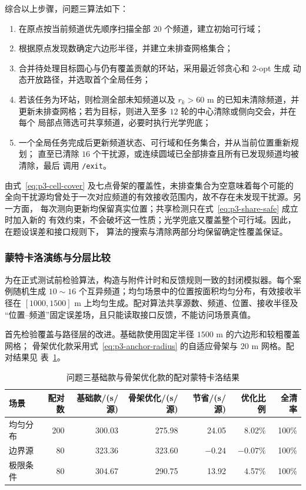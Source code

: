 综合以上步骤，问题三算法如下：
\begin{enumerate}
    \item 在原点按当前频道优先顺序扫描全部 $20$ 个频道，建立初始可行域；
    \item 根据原点发现数确定六边形半径，并建立未排查网格集合；
    \item 合并待处理目标圆心与仍有覆盖贡献的环站，采用最近邻贪心和 $2$-opt 生成
    动态开放路径，并选取首个全局任务；
    \item 若该任务为环站，则检测全部未知频道以及 $r_k>60$ m 的已知未清除频道，并
    更新未排查网格；若为目标，则进入至多 $12$ 轮的中心清除或侧向交会，并在每个
    局部点筛选可共享频道，必要时执行光学兜底；
    \item 一个全局任务完成后更新频道状态、可行域和任务集合，并从当前位置重新规划；
    直至已清除 $16$ 个干扰源，或连续圆域已全部排查且所有已发现频道均被清除，最后
    调用 \texttt{/exit}。
\end{enumerate}

由式~\eqref{eq:p3-cell-cover} 及七点骨架的覆盖性，未排查集合为空意味着每个可能的
全向干扰源均曾处于一次对应频道的有效接收范围内，故不存在未发现干扰源。另一方面，
每次测向更新均保留真实位置；共享检测只在式~\eqref{eq:p3-share-safe} 成立时加入新的
有效约束，不会破坏这一性质；光学兜底又覆盖整个可行域。因此，在题设误差和接口规则下，
算法的搜索与清除两部分均保留确定性覆盖保证。

\subsubsection{蒙特卡洛演练与分层比较}

为在正式测试前检验算法，构造与附件计时和反馈规则一致的封闭模拟器。每个案例随机生成
$10\sim16$ 个互异频道；均匀场景中的位置按面积均匀分布，有效接收半径在
$[1000,1500]$ m 上均匀生成。配对算法共享源数、频道、位置、接收半径及
“位置--频道”固定误差场，且只能读取接口反馈，不能访问场景真值。

首先检验覆盖与路径层的改进。基础款使用固定半径 $1500$ m 的六边形和较粗覆盖网格；
骨架优化款采用式~\eqref{eq:p3-anchor-radius} 的自适应骨架与 $20$ m 网格。配对结果见
表~\ref{tab:p3-mc}。

\begin{table}[htbp]
\centering
\small
\caption{问题三基础款与骨架优化款的配对蒙特卡洛结果}
\label{tab:p3-mc}
\begin{tabular}{lrrrrrr}
\toprule
场景 & 配对数 & 基础款/(s/源) & 骨架优化/(s/源) & 节省/(s/源) & 优化比例 & 全清率 \\
\midrule
均匀分布 & 200 & 300.03 & 275.98 & 24.05 & 8.02\% & 100\% \\
边界源   & 80  & 323.36 & 323.60 & $-0.24$ & $-0.07\%$ & 100\% \\
极限条件 & 80  & 304.67 & 290.75 & 13.92 & 4.57\% & 100\% \\
\bottomrule
\end{tabular}
\end{table}

